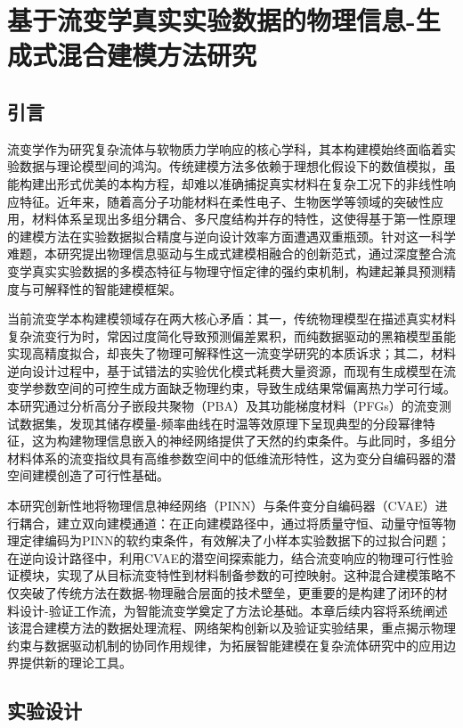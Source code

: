 \chapter{基于流变学真实实验数据的物理信息-生成式混合建模方法研究}
\section{引言}
流变学作为研究复杂流体与软物质力学响应的核心学科，其本构建模始终面临着实验数据与理论模型间的鸿沟。传统建模方法多依赖于理想化假设下的数值模拟，虽能构建出形式优美的本构方程，却难以准确捕捉真实材料在复杂工况下的非线性响应特征。近年来，随着高分子功能材料在柔性电子、生物医学等领域的突破性应用，材料体系呈现出多组分耦合、多尺度结构并存的特性，这使得基于第一性原理的建模方法在实验数据拟合精度与逆向设计效率方面遭遇双重瓶颈。针对这一科学难题，本研究提出物理信息驱动与生成式建模相融合的创新范式，通过深度整合流变学真实实验数据的多模态特征与物理守恒定律的强约束机制，构建起兼具预测精度与可解释性的智能建模框架。

当前流变学本构建模领域存在两大核心矛盾：其一，传统物理模型在描述真实材料复杂流变行为时，常因过度简化导致预测偏差累积，而纯数据驱动的黑箱模型虽能实现高精度拟合，却丧失了物理可解释性这一流变学研究的本质诉求；其二，材料逆向设计过程中，基于试错法的实验优化模式耗费大量资源，而现有生成模型在流变学参数空间的可控生成方面缺乏物理约束，导致生成结果常偏离热力学可行域。本研究通过分析高分子嵌段共聚物（PBA）及其功能梯度材料（PFGs）的流变测试数据集，发现其储存模量-频率曲线在时温等效原理下呈现典型的分段幂律特征，这为构建物理信息嵌入的神经网络提供了天然的约束条件。与此同时，多组分材料体系的流变指纹具有高维参数空间中的低维流形特性，这为变分自编码器的潜空间建模创造了可行性基础。

本研究创新性地将物理信息神经网络（PINN）与条件变分自编码器（CVAE）进行耦合，建立双向建模通道：在正向建模路径中，通过将质量守恒、动量守恒等物理定律编码为PINN的软约束条件，有效解决了小样本实验数据下的过拟合问题；在逆向设计路径中，利用CVAE的潜空间探索能力，结合流变响应的物理可行性验证模块，实现了从目标流变特性到材料制备参数的可控映射。这种混合建模策略不仅突破了传统方法在数据-物理融合层面的技术壁垒，更重要的是构建了闭环的材料设计-验证工作流，为智能流变学奠定了方法论基础。本章后续内容将系统阐述该混合建模方法的数据处理流程、网络架构创新以及验证实验结果，重点揭示物理约束与数据驱动机制的协同作用规律，为拓展智能建模在复杂流体研究中的应用边界提供新的理论工具。

\section{实验设计}
